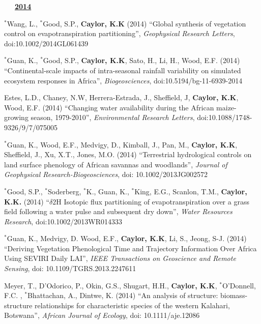 \documentclass[10pt]{report}
\begin{document}
\begin{etaremune}
\mbox{\ \ \ \underline{\textbf{2014}}}

\item $^{*}$Wang, L., $^{*}$Good, S.P.,  \textbf{Caylor, K.K} (2014) ``Global synthesis of vegetation control on evapotranspiration partitioning'', {\em Geophysical Research Letters}, doi:10.1002/2014GL061439

\item $^{*}$Guan, K., $^{*}$Good, S.P.,  \textbf{Caylor, K.K}, Sato, H., Li, H., Wood, E.F. (2014) ``Continental-scale impacts of intra-seasonal rainfall variability on simulated ecosystem responses in Africa'', {\em Biogeosciences}, doi:10.5194/bg-11-6939-2014

\item Estes, L.D., Chaney, N.W, Herrera-Estrada, J., Sheffield, J, \textbf{Caylor, K.K}, Wood, E.F. (2014) ``Changing water availability during the African maize-growing season, 1979-2010'', {\em Environmental Research Letters}, doi:10.1088/1748-9326/9/7/075005

\item $^{*}$Guan, K., Wood, E.F., Medvigy, D., Kimball, J., Pan, M., \textbf{Caylor, K.K}, Sheffield, J., Xu, X.T., Jones, M.O. (2014) ``Terrestrial hydrological controls on land surface phenology of African savannas and woodlands'', {\em Journal of Geophysical Research-Biogeosciences}, doi: 10.1002/2013JG002572

\item $^{*}$Good, S.P., $^{*}$Soderberg, $^{*}$K., Guan, K., $^{*}$King, E.G., Scanlon, T.M., \textbf{Caylor, K.K.} (2014) ``$\delta2$H Isotopic flux partitioning of evapotranspiration over a grass field following a water pulse and subsequent dry down'', {\em Water Resources Research}, doi:10.1002/2013WR014333

\item $^{*}$Guan, K., Medvigy, D. Wood, E.F., \textbf{Caylor, K.K}, Li, S., Jeong, S-J. (2014) ``Deriving Vegetation Phenological Time and Trajectory Information Over Africa Using SEVIRI Daily LAI'', {\em IEEE Transactions on Geoscience and Remote Sensing}, doi: 10.1109/TGRS.2013.2247611

\item Meyer, T., D'Odorico, P., Okin, G.S., Shugart, H.H., \textbf{Caylor, K.K}, $^{*}$O'Donnell, F.C. , $^{*}$Bhattachan, A., Dintwe, K. (2014) ``An analysis of structure: biomass-structure relationships for characteristic species of the western Kalahari, Botswana'', {\em African Journal of Ecology}, doi: 10.1111/aje.12086


\end{etaremune}
\end{document}
